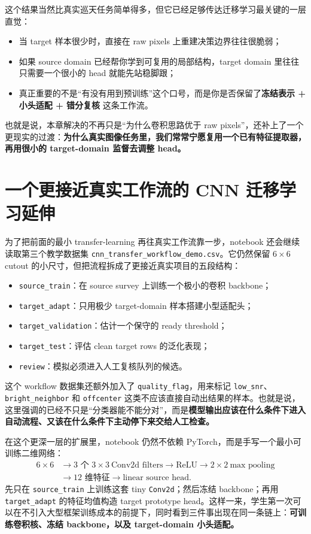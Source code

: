 这个结果当然比真实巡天任务简单得多，但它已经足够传达迁移学习最关键的一层直觉：

\begin{itemize}
    \item 当 target 样本很少时，直接在 raw pixels 上重建决策边界往往很脆弱；
    \item 如果 source domain 已经帮你学到可复用的局部结构，target domain 里往往只需要一个很小的 head 就能先站稳脚跟；
    \item 真正重要的不是“有没有用到预训练”这个口号，而是你是否保留了\textbf{冻结表示 + 小头适配 + 错分复核} 这条工作流。
\end{itemize}

也就是说，本章解决的不再只是“为什么卷积思路优于 raw pixels”，还补上了一个更现实的过渡：\textbf{为什么真实图像任务里，我们常常宁愿复用一个已有特征提取器，再用很小的 target-domain 监督去调整 head。}

\section{一个更接近真实工作流的 CNN 迁移学习延伸}

为了把前面的最小 transfer-learning 再往真实工作流靠一步，notebook 还会继续读取第三个教学数据集 \nolinkurl{cnn_transfer_workflow_demo.csv}。它仍然保留 \(6\times 6\) cutout 的小尺寸，但把流程拆成了更接近真实项目的五段结构：

\begin{itemize}
    \item \texttt{source\_train}：在 source survey 上训练一个极小的卷积 backbone；
    \item \texttt{target\_adapt}：只用极少 target-domain 样本搭建小型适配头；
    \item \texttt{target\_validation}：估计一个保守的 ready threshold；
    \item \texttt{target\_test}：评估 clean target rows 的泛化表现；
    \item \texttt{review}：模拟必须进入人工复核队列的候选。
\end{itemize}

这个 workflow 数据集还额外加入了 \texttt{quality\_flag}，用来标记 \texttt{low\_snr}、\texttt{bright\_neighbor} 和 \texttt{offcenter} 这类不应该直接自动出结果的样本。也就是说，这里强调的已经不只是“分类器能不能分对”，而是\textbf{模型输出应该在什么条件下进入自动流程、又该在什么条件下主动停下来交给人工检查。}

在这个更深一层的扩展里，notebook 仍然不依赖 PyTorch，而是手写一个最小可训练二维网络：
\[
\begin{aligned}
6\times 6
&\longrightarrow \text{3 个 } 3\times 3\ \text{Conv2d filters}
\longrightarrow \text{ReLU}
\longrightarrow 2\times 2\ \text{max pooling} \\
&\longrightarrow 12\text{ 维特征}
\longrightarrow \text{linear source head}.
\end{aligned}
\]
先只在 \texttt{source\_train} 上训练这套 tiny \texttt{Conv2d}；然后冻结 backbone；再用 \texttt{target\_adapt} 的特征均值构造 target prototype head。这样一来，学生第一次可以在不引入大型框架训练成本的前提下，同时看到三件事出现在同一条链上：\textbf{可训练卷积核、冻结 backbone，以及 target-domain 小头适配。}

